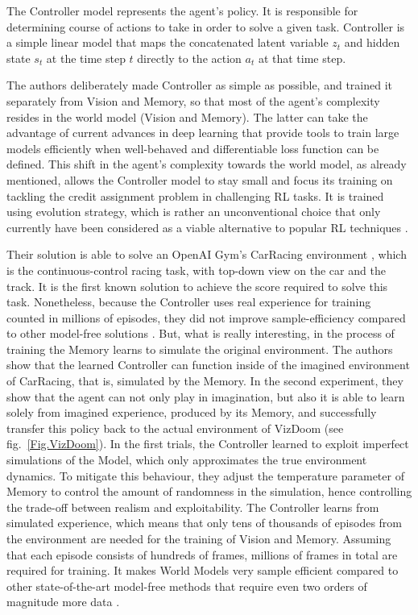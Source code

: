 The Controller model represents the agent's policy. It is responsible for determining course of actions to take in order to solve a given task. Controller is a simple linear model that maps the concatenated latent variable $z_t$ and hidden state $s_t$ at the time step $t$ directly to the action $a_t$ at that time step.

The authors deliberately made Controller as simple as possible, and trained it separately from Vision and Memory, so that most of the agent's complexity resides in the world model (Vision and Memory). The latter can take the advantage of current advances in deep learning that provide tools to train large models efficiently when well-behaved and differentiable loss function can be defined.
This shift in the agent's complexity towards the world model, as already mentioned, allows the Controller model to stay small and focus its training on tackling the credit assignment problem in challenging RL tasks. It is trained using evolution strategy, which is rather an unconventional choice that only currently have been considered as a viable alternative to popular RL techniques \cite{Algo.ESRL}.

Their solution is able to solve an OpenAI Gym's CarRacing environment \cite{Code.OpenAIGym}, which is the continuous-control racing task, with top-down view on the car and the track. It is the first known solution to achieve the score required to solve this task. Nonetheless, because the Controller uses real experience for training counted in millions of episodes, they did not improve sample-efficiency compared to other model-free solutions \cite{Algo.CarRacingA3C}. But, what is really interesting, in the process of training the Memory learns to simulate the original environment. The authors show that the learned Controller can function inside of the imagined environment of CarRacing, that is, simulated by the Memory.
In the second experiment, they show that the agent can not only play in imagination, but also it is able to learn solely from imagined experience, produced by its Memory, and successfully transfer this policy back to the actual environment of VizDoom (see fig.~\ref{Fig.VizDoom}). In the first trials, the Controller learned to exploit imperfect simulations of the Model, which only approximates the true environment dynamics. To mitigate this behaviour, they adjust the temperature parameter  \cite{Algo.Sketch-RNN} of Memory to control the amount of randomness in the simulation, hence controlling the trade-off between realism and exploitability.
The Controller learns from simulated experience, which means that only tens of thousands of episodes from the environment are needed for the training of Vision and Memory. Assuming that each episode consists of hundreds of frames, millions of frames in total are required for training. It makes World Models very sample efficient compared to other state-of-the-art model-free methods that require even two orders of magnitude more data \cite{Algo.A3C}.

